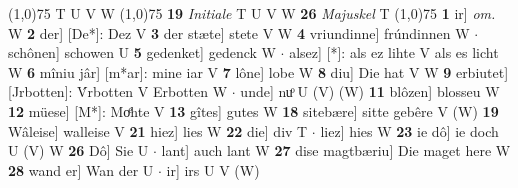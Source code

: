 \documentclass[8pt,a4paper,notitlepage]{article}
\begin{document}
\begin{table}[ht]
\begin{minipage}[t]{0.5\linewidth}
\scriptsize
\line(1,0){75} \newline
T U V W \newline
\line(1,0){75} \newline
\textbf{19} \textit{Initiale} T U V W  \textbf{26} \textit{Majuskel} T  \newline
\line(1,0){75} \newline
\textbf{1} ir] \textit{om.} W \textbf{2} der] [De*]: Dez V \textbf{3} der stæte] stete V W \textbf{4} vriundinne] frúndinnen W  $\cdot$ schônen] schowen U \textbf{5} gedenket] gedenck W  $\cdot$ alsez] [*]: als ez lihte V als es licht W \textbf{6} mîniu jâr] [m*ar]: mine iar V \textbf{7} lône] lobe W \textbf{8} diu] Die hat V W \textbf{9} erbiutet] [Jrbotten]: V́rbotten V Erbotten W  $\cdot$ unde] nuͦ U (V) (W) \textbf{11} blôzen] blosseu W \textbf{12} müese] [M*]: Moͤhte V \textbf{13} gîtes] gutes W \textbf{18} sitebære] sitte gebêre V (W) \textbf{19} Wâleise] walleise V \textbf{21} hiez] lies W \textbf{22} die] div T  $\cdot$ liez] hies W \textbf{23} ie dô] ie doch U (V) W \textbf{26} Dô] Sie U  $\cdot$ lant] auch lant W \textbf{27} dise magtbæriu] Die maget here W \textbf{28} wand er] Wan der U  $\cdot$ ir] irs U V (W) \newline
\end{minipage}
\end{table}
\end{document}
